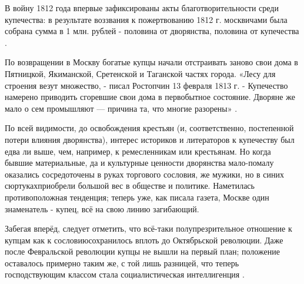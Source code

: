 \documentclass[a4paper,12pt]{article}
\begin{document}

В войну 1812 года впервые зафиксированы акты благотворительности среди купечества: в результате воззвания к пожертвованию 1812 г. москвичами была собрана сумма в 1 млн. рублей - половина от дворянства, половина от купечества \cite{burishk}.

По возвращении в Москву богатые купцы начали отстраивать заново свои дома в Пятницкой, Якиманской, Сретенской и Таганской частях города. «Лесу для строения везут множество, - писал Ростопчин 13 февраля 1813 г. - Купечество намерено приводить сгоревшие свои дома в первобытное состояние. Дворяне же мало о сем промышляют — причина та, что многие разорены» \cite{1812}.


По всей видимости, до освобождения крестьян (и, соответственно, постепенной потери влияния дворянства), интерес историков и литераторов к купечеству был едва ли выше, чем, например, к ремесленникам или крестьянам. Но когда бывшие материальные, да и культурные  ценности дворянства мало-помалу оказались сосредоточены в руках торгового сословия,  же мужики, но в синих сюртуках\rk приобрели большой вес в обществе и политике. Наметилась противоположная тенденция; теперь уже, как писала  газета\rk,  Москве один знаменатель - купец, всё на свою линию загибающий\rk \cite{burishk}.

Забегая вперёд, следует отметить, что всё-таки полупрезрительное отношение к купцам как к  сословию\rk сохранилось вплоть до Октябрьской революции. Даже после Февральской \rk революции купцы не вышли на первый план; положение оставалось примерно таким же, с той лишь разницей, что теперь господствующим классом стала социалистическая интеллигенция \cite{burishk}.\\



\end{document}
